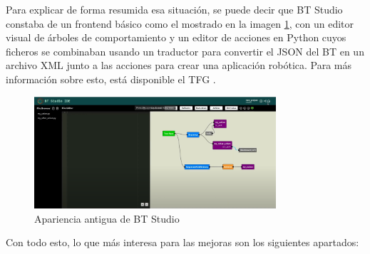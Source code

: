 Para explicar de forma resumida esa situación, se puede decir que BT Studio constaba de un frontend básico como el mostrado en la imagen \ref{fig:bt-old-ref}, con un editor visual de árboles de comportamiento y un editor de acciones en Python cuyos ficheros se combinaban usando un traductor para convertir el JSON del BT en un archivo XML junto a las acciones para crear una aplicación robótica. Para más información sobre esto, está disponible el TFG \cite{TFG_BT_Studio}.

\begin{figure}[H]
    \centering
    \includegraphics[width=0.8\textwidth]{figures/bt-studio/bt-old.png}
    \caption{Apariencia antigua de BT Studio}
    \label{fig:bt-old-ref}
\end{figure}

Con todo esto, lo que más interesa para las mejoras son los siguientes apartados:




